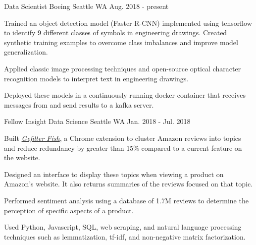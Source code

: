 


\begin{cventries}


\cventry
{Data Scientist} %
{Boeing} %
{Seattle WA} %
{Aug. 2018 - present} %
{ %
\begin{cvitems}
 \vspace{0.1cm}
\item {Trained an object detection model (Faster R-CNN) implemented using tensorflow to identify 9 different classes of symbols in engineering drawings. Created synthetic training examples to overcome class imbalances and improve model generalization.\vspace{0.1cm}}
\item {Applied classic image processing techniques and open-source optical character recognition models to interpret text in engineering drawings. \vspace{0.1cm}}
\item {Deployed these models in a continuously running docker container that receives messages from and send results to a kafka server.}
\end{cvitems}
}


\cventry
{Fellow} %
{Insight Data Science} %
{Seattle WA} %
{Jan. 2018 - Jul. 2018} %
{ %
\begin{cvitems}
 \vspace{0.1cm}
\item {Built \href{https://gefilterfish.science}{\textit{Gefilter Fish}}, a Chrome extension to cluster Amazon reviews into topics and reduce redundancy by greater than 15\% compared to a current feature on the website.\vspace{0.1cm}}
\item{Designed an interface to display these topics when viewing a product on Amazon's website. It also returns summaries of the reviews focused on that topic.\vspace{0.1cm}}
\item{Performed sentiment analysis using a database of 1.7M reviews to determine the perception of specific aspects of a product.\vspace{0.1cm}}
\item{Used Python, Javascript, SQL, web scraping, and natural language processing techniques such as lemmatization, tf-idf, and non-negative matrix factorization.}
\end{cvitems}
}


\end{cventries}
